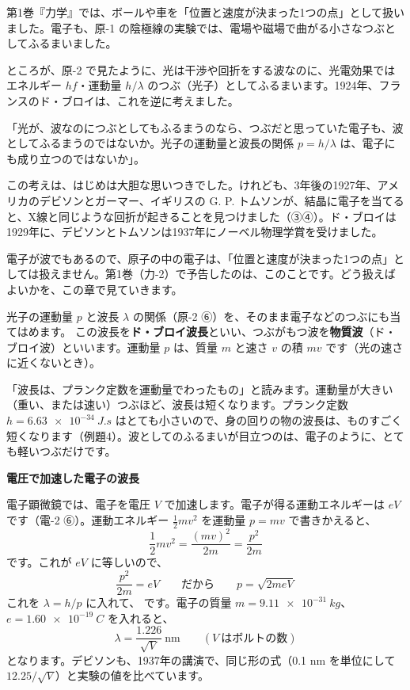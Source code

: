 
\label{ph:原-3:sec1}
第1巻『力学』では、ボールや車を「位置と速度が決まった1つの点」として扱いました。電子も、原-1 の陰極線の実験では、電場や磁場で曲がる小さなつぶとしてふるまいました。

ところが、原-2 で見たように、光は干渉や回折をする波なのに、光電効果ではエネルギー $hf$・運動量 $h/\lambda$ のつぶ（光子）としてふるまいます。1924年、フランスのド・ブロイは、これを逆に考えました。
\begin{phyomi}[ド・ブロイの考え]
「光が、波なのにつぶとしてもふるまうのなら、つぶだと思っていた電子も、波としてふるまうのではないか。光子の運動量と波長の関係 $p=h/\lambda$ は、電子にも成り立つのではないか」。
\end{phyomi}
この考えは、はじめは大胆な思いつきでした。けれども、3年後の1927年、アメリカのデビソンとガーマー、イギリスの G. P. トムソンが、結晶に電子を当てると、X線と同じような回折が起きることを見つけました（③④）。ド・ブロイは1929年に、デビソンとトムソンは1937年にノーベル物理学賞を受けました。

電子が波でもあるので、原子の中の電子は、「位置と速度が決まった1つの点」としては扱えません。第1巻（力-2）で予告したのは、このことです。どう扱えばよいかを、この章で見ていきます。

\label{ph:原-3:sec2}
光子の運動量 $p$ と波長 $\lambda$ の関係（原-2 ⑥）を、そのまま電子などのつぶにも当てはめます。
\label{ph:原-3:debroglie}この波長を\textbf{ド・ブロイ波長}といい、つぶがもつ波を\textbf{物質波}（ド・ブロイ波）といいます。運動量 $p$ は、質量 $m$ と速さ $v$ の積 $mv$ です（光の速さに近くないとき）。

\begin{phyomi}[$\lambda=\dfrac{h}{p}$]
「波長は、プランク定数を運動量でわったもの」と読みます。運動量が大きい（重い、または速い）つぶほど、波長は短くなります。プランク定数 $h=\qty{6.63e-34}{J.s}$ はとても小さいので、身の回りの物の波長は、ものすごく短くなります（例題4）。波としてのふるまいが目立つのは、電子のように、とても軽いつぶだけです。
\end{phyomi}

\noindent\textbf{電圧で加速した電子の波長}\par\nobreak
電子顕微鏡では、電子を電圧 $V$ で加速します。電子が得る運動エネルギーは $eV$ です（電-2 ⑥）。運動エネルギー $\tfrac12mv^2$ を運動量 $p=mv$ で書きかえると、
\[ \frac12mv^2=\frac{(mv)^2}{2m}=\frac{p^2}{2m} \]
です。これが $eV$ に等しいので、
\[ \frac{p^2}{2m}=eV\qquad\text{だから}\qquad p=\sqrt{2meV} \]
これを $\lambda=h/p$ に入れて、
\label{ph:原-3:kasoku}です。電子の質量 $m=\qty{9.11e-31}{kg}$、$e=\qty{1.60e-19}{C}$ を入れると、
\[ \lambda=\frac{1.226}{\sqrt{V}}\ \mathrm{nm}\qquad(V\ \text{はボルトの数}) \]
となります。デビソンも、1937年の講演で、同じ形の式（0.1 nm を単位にして $12.25/\sqrt V$）と実験の値を比べています。

